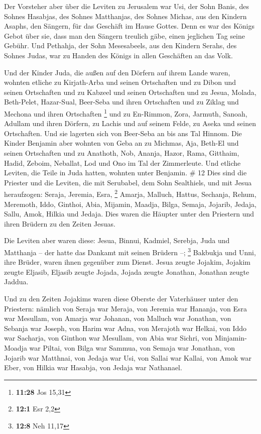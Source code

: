  Der Vorsteher aber über die Leviten zu Jerusalem war Usi,
der Sohn Banis, des Sohnes Hasabjas, des Sohnes Matthanjas, des Sohnes
Michas, aus den Kindern Asaphs, den Sängern, für das Geschäft im Hause
Gottes.  Denn es war des Königs Gebot über sie, dass man
den Sängern treulich gäbe, einen jeglichen Tag seine Gebühr.
 Und Pethahja, der Sohn Mesesabeels, aus den Kindern
Serahs, des Sohnes Judas, war zu Handen des Königs in allen Geschäften
an das Volk.

 Und der Kinder Juda, die außen auf den Dörfern auf ihrem
Lande waren, wohnten etliche zu Kirjath-Arba und seinen Ortschaften und
zu Dibon und seinen Ortschaften und zu Kabzeel und seinen Ortschaften
 und zu Jesua, Molada, Beth-Pelet, 
Hazar-Sual, Beer-Seba und ihren Ortschaften  und zu Ziklag
und Mechona und ihren Ortschaften \footnote{\textbf{11:28} Jos 15,31}
 und zu En-Rimmon, Zora, Jarmuth,  Sanoah,
Adullam und ihren Dörfern, zu Lachis und auf seinem Felde, zu Aseka und
seinen Ortschaften. Und sie lagerten sich von Beer-Seba an bis ans Tal
Hinnom.  Die Kinder Benjamin aber wohnten von Geba an zu
Michmas, Aja, Beth-El und seinen Ortschaften  und zu
Anathoth, Nob, Ananja,  Hazor, Rama, Gitthaim,
 Hadid, Zeboim, Neballat,  Lod und Ono im Tal
der Zimmerleute.  Und etliche Leviten, die Teile in Juda
hatten, wohnten unter Benjamin. \# 12  Dies sind die
Priester und die Leviten, die mit Serubabel, dem Sohn Sealthiels, und
mit Jesua heraufzogen: Seraja, Jeremia, Esra, \footnote{\textbf{12:1}
  Esr 2,2}  Amarja, Malluch, Hattus,  Sechanja,
Rehum, Meremoth,  Iddo, Ginthoi, Abia,  Mijamin,
Maadja, Bilga,  Semaja, Jojarib, Jedaja,  Sallu,
Amok, Hilkia und Jedaja. Dies waren die Häupter unter den Priestern und
ihren Brüdern zu den Zeiten Jesuas.

 Die Leviten aber waren diese: Jesua, Binnui, Kadmiel,
Serebja, Juda und Matthanja -- der hatte das Dankamt mit seinen Brüdern
--; \footnote{\textbf{12:8} Neh 11,17}  Bakbukja und Unni,
ihre Brüder, waren ihnen gegenüber zum Dienst.  Jesua
zeugte Jojakim, Jojakim zeugte Eljasib, Eljasib zeugte Jojada,
 Jojada zeugte Jonathan, Jonathan zeugte Jaddua.

 Und zu den Zeiten Jojakims waren diese Oberste der
Vaterhäuser unter den Priestern: nämlich von Seraja war Meraja, von
Jeremia war Hananja,  von Esra war Mesullam, von Amarja war
Johanan,  von Malluch war Jonathan, von Sebanja war Joseph,
 von Harim war Adna, von Merajoth war Helkai, 
von Iddo war Sacharja, von Ginthon war Mesullam,  von Abia
war Sichri, von Minjamin-Moadja war Piltai,  von Bilga war
Sammua, von Semaja war Jonathan,  von Jojarib war Matthnai,
von Jedaja war Usi,  von Sallai war Kallai, von Amok war
Eber,  von Hilkia war Hasabja, von Jedaja war Nathanael.

